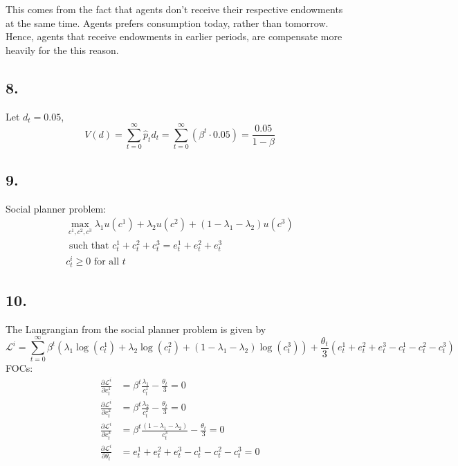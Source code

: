 \documentclass[12pt]{article}
\theoremstyle{definition}
\newcommand\st{\text{ such that }}
\begin{document}
This comes from the fact that agents don't receive their respective endowments at the same time. Agents prefers consumption today, rather than tomorrow. Hence, agents that receive endowments in earlier periods, are compensate more heavily for the this reason.

\subsection*{8.}

Let $d_t = 0.05$,
\[
V(d)=\sum_{t=0}^{\infty} \hat{p}_t d_t = \sum_{t=0}^{\infty} (\beta^t \cdot 0.05) = \frac{0.05}{1-\beta}
\]

\subsection*{9.}

Social planner problem:
	\[
\begin{split}
\max_{c^1,c^2,c^3} \lambda_1 u(c^1) +\lambda_2 u(c^2) + (1-\lambda_1 -\lambda_2) u(c^3) \\
\st c_t^1+c_t^2+c_t^3=e_t^1+e_t^2+e_t^3\\
c_{t}^i\geq 0 \text{ for all }t
\end{split}
\]

\subsection*{10.}

The Langrangian from the social planner problem is given by
\[
\mathcal{L}^i = \sum_{t=0}^{\infty}\beta^t(\lambda_1 \log(c_t^1) +\lambda_2 \log(c_t^2) + (1-\lambda_1 -\lambda_2) \log(c_t^3)) + \frac{\theta_t}{3} (e_t^1+e_t^2+e_t^3 - c_t^1-c_t^2-c_t^3)
\]
FOCs:
\begin{align*}
\frac{\partial \mathcal{L}^i}{\partial c_t^1} & = \beta^t \frac{\lambda_1}{c_t^1} - \frac{\theta_t}{3}  =0 \\
\frac{\partial \mathcal{L}^i}{\partial c_t^2} & = \beta^t \frac{\lambda_2}{c_t^2} - \frac{\theta_t}{3}  =0 \\
\frac{\partial \mathcal{L}^i}{\partial c_t^3} & = \beta^t \frac{(1-\lambda_1 -\lambda_2)}{c_t^3} - \frac{\theta_t}{3}  =0 \\
\frac{\partial \mathcal{L}^i}{\partial\theta_t } & = e_t^1+e_t^2+e_t^3 - c_t^1-c_t^2-c_t^3 =0
\end{align*}
\end{document}
